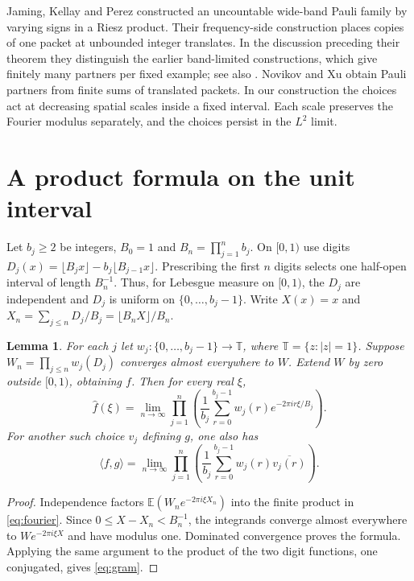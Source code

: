 \documentclass[11pt,reqno]{amsart}
\newtheorem{lem}[thm]{Lemma}
\newcommand{\T}{\mathbb T}
\newcommand{\E}{\mathbb E}
\begin{document}
Jaming, Kellay and Perez \cite[Theorem~4.3 in the preprint]{jkp} constructed an uncountable wide-band Pauli family by varying signs in a Riesz product. Their frequency-side construction places copies of one packet at unbounded integer translates. In the discussion preceding their theorem they distinguish the earlier band-limited constructions, which give finitely many partners per fixed example; see also \cite{jaming}. Novikov and Xu \cite[Theorem~2]{nx} obtain Pauli partners from finite sums of translated packets. In our construction the choices act at decreasing spatial scales inside a fixed interval. Each scale preserves the Fourier modulus separately, and the choices persist in the \(L^2\) limit.

\section{A product formula on the unit interval}

Let \(b_j\ge2\) be integers, \(B_0=1\) and \(B_n=\prod_{j=1}^n b_j\). On \([0,1)\) use digits \(D_j(x)=\lfloor B_j x\rfloor-b_j\lfloor B_{j-1}x\rfloor\). Prescribing the first \(n\) digits selects one half-open interval of length \(B_n^{-1}\). Thus, for Lebesgue measure on \([0,1)\), the \(D_j\) are independent and \(D_j\) is uniform on \(\{0,\ldots,b_j-1\}\). Write \(X(x)=x\) and \(X_n=\sum_{j\le n}D_j/B_j=\lfloor B_n X\rfloor/B_n\).

\begin{lem}\label{lem:product}
For each \(j\) let \(w_j:\{0,\ldots,b_j-1\}\to\T\), where \(\T=\{z:|z|=1\}\). Suppose \(W_n=\prod_{j\le n}w_j(D_j)\) converges almost everywhere to \(W\). Extend \(W\) by zero outside \([0,1)\), obtaining \(f\). Then for every real \(\xi\),
\begin{equation}\label{eq:fourier}
 \widehat f(\xi)=\lim_{n\to\infty}\prod_{j=1}^n
 \left(\frac{1}{b_j}\sum_{r=0}^{b_j-1} w_j(r)e^{-2\pi i r\xi/B_j}\right).
\end{equation}
For another such choice \(v_j\) defining \(g\), one also has
\begin{equation}\label{eq:gram}
 \langle f,g\rangle=\lim_{n\to\infty}\prod_{j=1}^n
 \left(\frac{1}{b_j}\sum_{r=0}^{b_j-1}w_j(r)\overline{v_j(r)}\right).
\end{equation}
\end{lem}
\begin{proof}
Independence factors \(\E(W_n e^{-2\pi i\xi X_n})\) into the finite product in \eqref{eq:fourier}. Since \(0\le X-X_n<B_n^{-1}\), the integrands converge almost everywhere to \(W e^{-2\pi i\xi X}\) and have modulus one. Dominated convergence proves the formula. Applying the same argument to the product of the two digit functions, one conjugated, gives \eqref{eq:gram}.
\end{proof}
\end{document}
